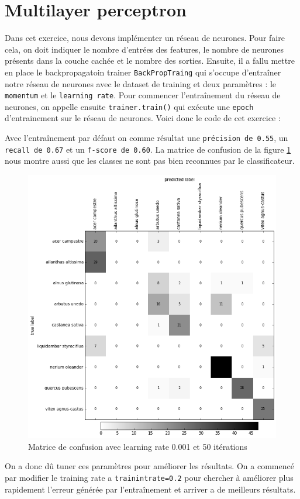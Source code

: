 \section{Multilayer perceptron}


Dans cet exercice, nous devons implémenter un réseau de neurones. Pour faire cela, on doit indiquer le nombre d'entrées des features, le nombre de neurones présents dans la couche cachée et le nombre des sorties. Ensuite, il a fallu mettre en place le backpropagatoin trainer \texttt{BackPropTraing} qui s'occupe d'entraîner notre réseau de neurones avec le dataset de training et deux paramètres : le \texttt{momentum} et le \texttt{learning rate}. Pour commencer l'entraînement du réseau de neurones, on appelle ensuite \texttt{trainer.train()} qui exécute une \texttt{epoch} d'entrainement sur le réseau de neurones. Voici donc le code de cet exercice :


\newpage


Avec l'entraînement par défaut on comme résultat une \texttt{précision de 0.55}, un \texttt{recall de 0.67} et un \texttt{f-score de 0.60}. La matrice de confusion de la figure \ref{mat001} nous montre aussi que les classes ne sont pas bien reconnues par le classificateur.

\begin{figure}[h]
  \centering
    \includegraphics[width=0.6\linewidth]{img/mconf_001.png}
  \caption{Matrice de confusion avec learning rate 0.001 et 50 itérations}
  \label{mat001}
\end{figure}
\newpage


On a donc dû tuner ces paramètres pour améliorer les résultats. On a commencé par modifier le training rate a \texttt{trainintrate=0.2} pour chercher à améliorer plus rapidement l'erreur générée par l'entraînement et arriver a de meilleurs résultats. 


